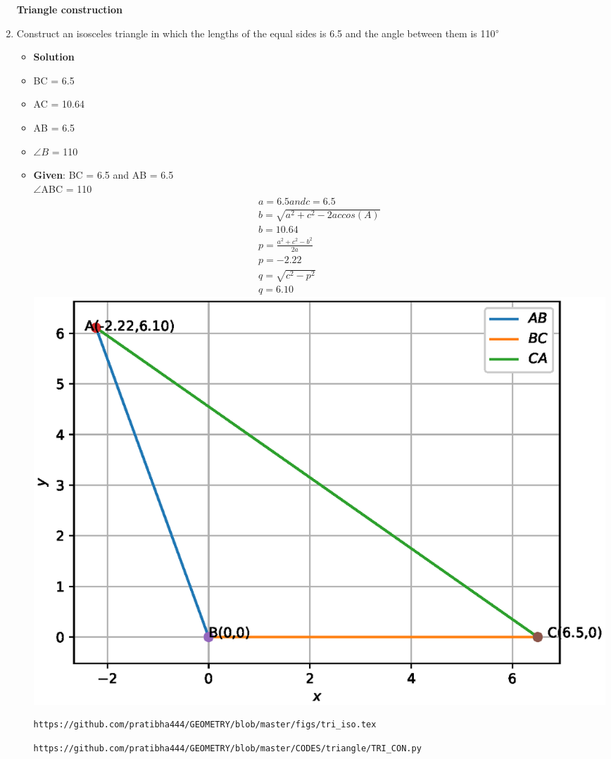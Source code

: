 \documentclass[journal,12pt,twocolumn]{IEEEtran}
\begin{document}
\begin{enumerate}[label=\arabic*]
\textbf{Triangle construction}\\

\item Construct an isosceles triangle in which the lengths of the equal sides is 6.5 and the angle between them is 110$\degree$
\begin{itemize}
\item\textbf{Solution}\\

\item BC = 6.5 \item AC = 10.64
\item AB = 6.5
\item $\angle B$ = 110\\ 
\item\textbf{Given}: BC = 6.5 and AB = 6.5\\
$\angle$ABC = 110
\begin{align*}
a = 6.5 and  c = 6.5\\
b = \sqrt{a^2 + c^2 - 2ac cos(A)}\\
b= 10.64\\
p=\frac{a^2 + c^2 - b^2}{2a}\\
p=-2.22\\
q=\sqrt{c^2 - p^ 2}\\
q = 6.10
\end{align*}
\includegraphics[scale=.4]{./figs/TRI_CON.eps}
\begin{lstlisting}
https://github.com/pratibha444/GEOMETRY/blob/master/figs/tri_iso.tex
\end{lstlisting}
\begin{lstlisting}
https://github.com/pratibha444/GEOMETRY/blob/master/CODES/triangle/TRI_CON.py
\end{lstlisting}
\end{itemize}






\end{enumerate}
\end{document}
